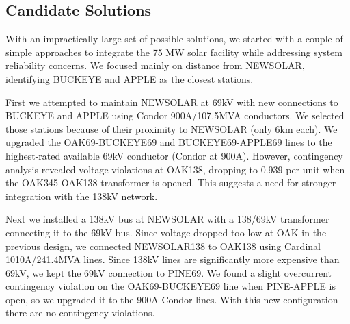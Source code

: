 \documentclass[conference]{IEEEtran}
\begin{document}
\subsection{Candidate Solutions}
With an impractically large set of possible solutions, we started with a couple of simple approaches to integrate the 75 MW solar facility while addressing system reliability concerns. We focused mainly on distance from NEWSOLAR, identifying BUCKEYE and APPLE as the closest stations.

First we attempted to maintain NEWSOLAR at 69kV with new connections to BUCKEYE and APPLE using Condor 900A/107.5MVA conductors. We selected those stations because of their proximity to NEWSOLAR (only 6km each). We upgraded the OAK69-BUCKEYE69 and BUCKEYE69-APPLE69 lines to the highest-rated available 69kV conductor (Condor at 900A). However, contingency analysis revealed voltage violations at OAK138, dropping to 0.939 per unit when the OAK345-OAK138 transformer is opened. This suggests a need for stronger integration with the 138kV network.

Next we installed a 138kV bus at NEWSOLAR with a 138/69kV transformer connecting it to the 69kV bus. Since voltage dropped too low at OAK in the previous design, we connected NEWSOLAR138 to OAK138 using Cardinal 1010A/241.4MVA lines. Since 138kV lines are significantly more expensive than 69kV, we kept the 69kV connection to PINE69. We found a slight overcurrent contingency violation on the OAK69-BUCKEYE69 line when PINE-APPLE is open, so we upgraded it to the 900A Condor lines. With this new configuration there are no contingency violations.
\end{document}
